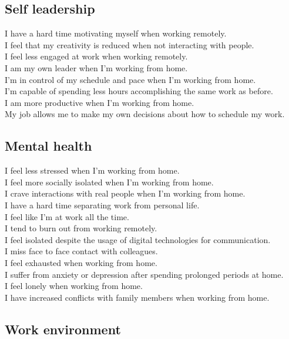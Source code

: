 \documentclass[12pt]{article}
\begin{document}
\subsection*{Self leadership}

I have a hard time motivating myself when working remotely. \\
I feel that my creativity is reduced when not interacting with people. \\
I feel less engaged at work when working remotely. \\
I am my own leader when I’m working from home. \\
I’m in control of my schedule and pace when I'm working from home. \\
I’m capable of spending less hours accomplishing the same work as before. \\
I am more productive when I’m working from home.  \\
My job allows me to make my own decisions about how to schedule my work.

\subsection*{Mental health}

I feel less stressed when I’m working from home. \\
I feel more socially isolated when I’m working from home. \\
I crave interactions with real people when I’m working from home. \\
I have a hard time separating work from personal life. \\
I feel like I'm at work all the time.  \\
I tend to burn out from working remotely. \\
I feel isolated despite the usage of digital technologies for communication. \\
I miss face to face contact with colleagues. \\
I feel exhausted when working from home. \\
I suffer from anxiety or depression after spending prolonged periods at home. \\
I feel lonely when working from home. \\
I have increased conflicts with family members when working from home. 

\subsection*{Work environment}
\end{document}

